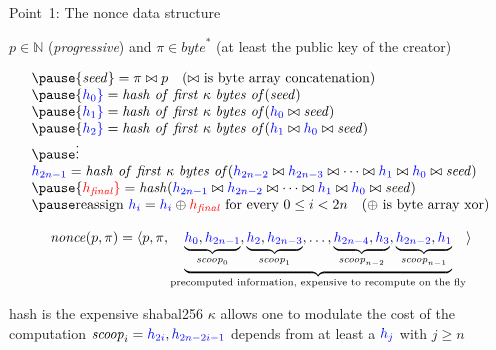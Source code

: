 \documentclass[11pt]{beamer}  %
\newcommand{\nonce}{{\mathit{nonce}}}
\newcommand{\scoop}{{\mathit{scoop}}}
\newcommand{\seed}{{\mathit{seed}}}
\newcommand{\hash}{{\mathit{hash}}}
\newcommand{\hashfirstk}{{\mathit{hash\ of\ first\ \kappa\ bytes\ of}}}
\newcommand{\finalhash}{{h_{\mathit{final}}}}
\begin{document}
\begin{frame}{Point~1: The nonce data structure}
  \begin{center}
    $p\in\mathbb{N}$ (\emph{progressive}) and $\pi\in\mathit{byte}^*$ (at least the public key of the creator)
  \end{center}
  \[\begin{array}{l}
  \pause
  \seed=\pi\bowtie p\quad\text{($\bowtie$ is byte array concatenation)}\\
  \pause
  {\color{blue} h_0}=\hashfirstk(\seed)\\
  \pause
  {\color{blue} h_1}=\hashfirstk({\color{blue} h_0}\bowtie\seed)\\
  \pause
  {\color{blue} h_2}=\hashfirstk({\color{blue} h_1}\bowtie{\color{blue}  h_0}\bowtie \seed)\\
  \pause
  \vdots\\
  {\color{blue} h_{2n-1}}=\hashfirstk({\color{blue} h_{2n-2}}\bowtie{\color{blue} h_{2n-3}}\bowtie\cdots\bowtie{\color{blue} h_1}\bowtie{\color{blue} h_0}\bowtie \seed)\\
  \pause
  {\color{red}\finalhash}=\hash({\color{blue} h_{2n-1}}\bowtie{\color{blue} h_{2n-2}}\bowtie\cdots\bowtie{\color{blue} h_1}\bowtie{\color{blue} h_0}\bowtie \seed)\\
  \pause
  \text{reassign }{\color{blue} h_i}={\color{blue} h_i}\oplus{\color{red}\finalhash}\text{ for every }0\le i<2n\quad\text{($\oplus$ is byte array xor)}\\
  \end{array}\]

  \pause

  \[
  \nonce(p,\pi)=\langle p,\pi,\underbrace{\underbrace{{\color{blue}h_0},{\color{blue}h_{2n-1}}}_{\scoop_0},\underbrace{{\color{blue}h_2},{\color{blue}h_{2n-3}}}_{\scoop_1},\ldots,\underbrace{{\color{blue}h_{2n-4}},{\color{blue}h_3}}_{\scoop_{n-2}},\underbrace{{\color{blue}h_{2n-2}},{\color{blue}h_1}}_{\scoop_{n-1}}}_{\text{precomputed information, expensive to recompute on the fly}}\rangle
  \]

  \begin{overprint}
    \centering hash is the expensive shabal256
    \centering $\kappa$ allows one to modulate the cost of the computation
    \centering $\scoop_i={\color{blue}h_{2i}},{\color{blue}h_{2n-2i-1}}$ depends from at least a ${\color{blue}h_j}$ with $j\ge n$
  \end{overprint}

\end{frame}
\end{document}
